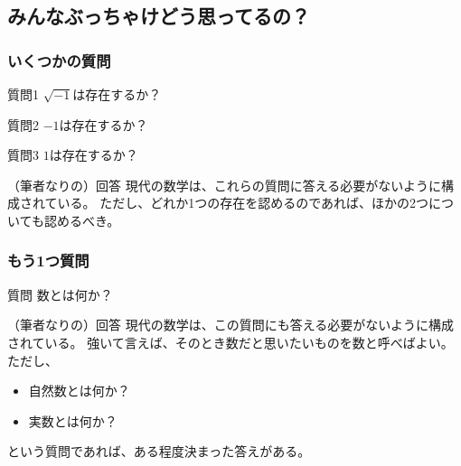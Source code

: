 \documentclass[dvipdfmx]{beamer}
\begin{document}
  \subsection{みんなぶっちゃけどう思ってるの？}

  \begin{frame}
    \frametitle{いくつかの質問}

    \begin{block}{質問1}
      $\sqrt{-1}$は存在するか？
    \end{block}

    \pause

    \begin{block}{質問2}
      $-1$は存在するか？
    \end{block}

    \pause

    \begin{block}{質問3}
      $1$は存在するか？
    \end{block}

    \pause

    \begin{block}{（筆者なりの）回答}
      現代の数学は、これらの質問に答える必要がないように構成されている。
      ただし、どれか1つの存在を認めるのであれば、ほかの2つについても認めるべき。
    \end{block}

  \end{frame}

  \begin{frame}
    \frametitle{もう1つ質問}

    \begin{block}{質問}
      数とは何か？
    \end{block}

    \pause

    \begin{block}{（筆者なりの）回答}
      現代の数学は、この質問にも答える必要がないように構成されている。
      強いて言えば、そのとき数だと思いたいものを数と呼べばよい。
      ただし、
      \begin{itemize}
        \item 自然数とは何か？
        \item 実数とは何か？
      \end{itemize}
      という質問であれば、ある程度決まった答えがある。
    \end{block}

  \end{frame}
\end{document}
